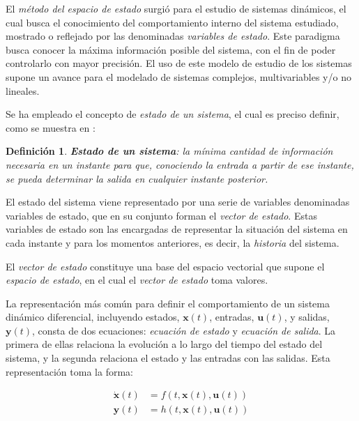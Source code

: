 El \emph{método del espacio de estado} surgió para el estudio de sistemas dinámicos, el cual busca el conocimiento del comportamiento interno del sistema estudiado, mostrado o reflejado por las denominadas \emph{variables de estado}. Este paradigma busca conocer la máxima información posible del sistema, con el fin de poder controlarlo con mayor precisión. El uso de este modelo de estudio de los sistemas supone un avance para el modelado de sistemas complejos, multivariables y/o no lineales. \par 

Se ha empleado el concepto de \emph{estado de un sistema}, el cual es preciso definir, como se muestra en \cite{dominguez2000control}:

\newtheorem{defin1}{Definición}

\begin{defin1} \textbf{Estado de un sistema}: la mínima cantidad de información necesaria en un instante para que, conociendo la entrada a partir de ese instante, se pueda determinar la salida en cualquier instante posterior.
\end{defin1} 

El estado del sistema viene representado por una serie de variables denominadas variables de estado, que en su conjunto forman el \emph{vector de estado}. Estas variables de estado son las encargadas de representar la situación del sistema en cada instante y para los momentos anteriores, es decir, la \emph{historia} del sistema. \par 

El \emph{vector de estado} constituye una base del espacio vectorial que supone el \emph{espacio de estado}, en el cual el \emph{vector de estado} toma valores. \par 

La representación más común para definir el comportamiento de un sistema dinámico diferencial, incluyendo estados, $\boldsymbol{x}(t)$, entradas, $\boldsymbol{u}(t)$, y salidas, $\boldsymbol{y}(t)$, consta de dos ecuaciones: \emph{ecuación de estado} y \emph{ecuación de salida}. La primera de ellas relaciona la evolución a lo largo del tiempo del estado del sistema, y la segunda relaciona el estado y las entradas con las salidas. Esta representación toma la forma:

\begin{subequations}
\begin{align}
	\boldsymbol{\dot{x}}(t) &= f(t,\boldsymbol{x}(t),\boldsymbol{u}(t)) \\
	\boldsymbol{y}(t) &= h(t,\boldsymbol{x}(t),\boldsymbol{u}(t))
\end{align}
\label{eq:lineal}
\end{subequations}

